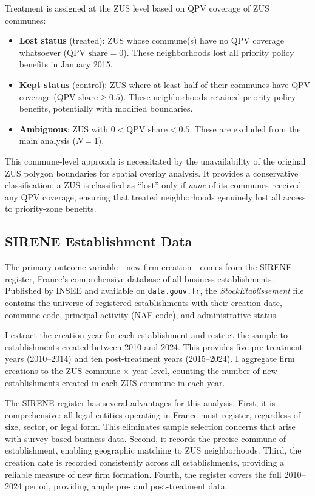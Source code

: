 \documentclass[12pt]{article}
\begin{document}
Treatment is assigned at the ZUS level based on QPV coverage of ZUS communes:

\begin{itemize}
\item \textbf{Lost status} (treated): ZUS whose commune(s) have no QPV coverage whatsoever ($\text{QPV share} = 0$). These neighborhoods lost all priority policy benefits in January 2015.
\item \textbf{Kept status} (control): ZUS where at least half of their communes have QPV coverage ($\text{QPV share} \geq 0.5$). These neighborhoods retained priority policy benefits, potentially with modified boundaries.
\item \textbf{Ambiguous}: ZUS with $0 < \text{QPV share} < 0.5$. These are excluded from the main analysis ($N = 1$).
\end{itemize}

This commune-level approach is necessitated by the unavailability of the original ZUS polygon boundaries for spatial overlay analysis. It provides a conservative classification: a ZUS is classified as ``lost'' only if \textit{none} of its communes received any QPV coverage, ensuring that treated neighborhoods genuinely lost all access to priority-zone benefits.

\subsection{SIRENE Establishment Data}

The primary outcome variable---new firm creation---comes from the SIRENE register, France's comprehensive database of all business establishments. Published by INSEE and available on \texttt{data.gouv.fr}, the \textit{StockEtablissement} file contains the universe of registered establishments with their creation date, commune code, principal activity (NAF code), and administrative status.

I extract the creation year for each establishment and restrict the sample to establishments created between 2010 and 2024. This provides five pre-treatment years (2010--2014) and ten post-treatment years (2015--2024). I aggregate firm creations to the ZUS-commune $\times$ year level, counting the number of new establishments created in each ZUS commune in each year.

The SIRENE register has several advantages for this analysis. First, it is comprehensive: all legal entities operating in France must register, regardless of size, sector, or legal form. This eliminates sample selection concerns that arise with survey-based business data. Second, it records the precise commune of establishment, enabling geographic matching to ZUS neighborhoods. Third, the creation date is recorded consistently across all establishments, providing a reliable measure of new firm formation. Fourth, the register covers the full 2010--2024 period, providing ample pre- and post-treatment data.
\end{document}
